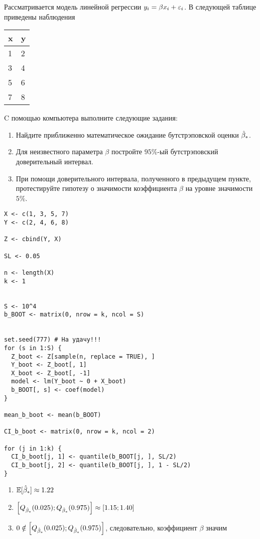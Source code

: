 \begin{problem}
Рассматривается модель линейной регрессии $y_i = \beta x_i + \varepsilon_i$. В следующей таблице приведены наблюдения

\begin{tabular}{ll}
\toprule
x & y \\
\midrule
1 & 2 \\
3 & 4 \\
5 & 6 \\
7 & 8 \\
\bottomrule
\end{tabular}

C помощью компьютера выполните следующие задания:

\begin{enumerate}
\item Найдите приближенно математическое ожидание бутстрэповской оценки $\hat{\beta}_*$.
\item Для неизвестного параметра $\beta$ постройте $95\%$-ый бутстрэповский доверительный интервал.
\item При помощи доверительного интервала, полученного в предыдущем пункте, протестируйте гипотезу о значимости коэффициента $\beta$ на уровне значимости $5\%$.
\end{enumerate}


\begin{sol}

\begin{verbatim}
X <- c(1, 3, 5, 7)
Y <- c(2, 4, 6, 8)

Z <- cbind(Y, X)

SL <- 0.05

n <- length(X)
k <- 1


S <- 10^4
b_BOOT <- matrix(0, nrow = k, ncol = S)


set.seed(777) # На удачу!!!
for (s in 1:S) {
  Z_boot <- Z[sample(n, replace = TRUE), ]
  Y_boot <- Z_boot[, 1]
  X_boot <- Z_boot[, -1]
  model <- lm(Y_boot ~ 0 + X_boot)
  b_BOOT[, s] <- coef(model)
}

mean_b_boot <- mean(b_BOOT)

CI_b_boot <- matrix(0, nrow = k, ncol = 2)

for (j in 1:k) {
  CI_b_boot[j, 1] <- quantile(b_BOOT[j, ], SL/2)
  CI_b_boot[j, 2] <- quantile(b_BOOT[j, ], 1 - SL/2)
}
\end{verbatim}

\begin{enumerate}
\item $\mathbb{E} [\hat{\beta}_*] \approx 1.22 $
\item $\left[ Q_{\hat{\beta}_*} (0.025);  Q_{\hat{\beta}_*} (0.975) \right] \approx \left[1.15; 1.40 \right] $
\item $0 \notin  \left[ Q_{\hat{\beta}_*} (0.025);  Q_{\hat{\beta}_*} (0.975) \right]$, следовательно, коэффициент $\beta$ значим
\end{enumerate}
\end{sol}
\end{problem}


